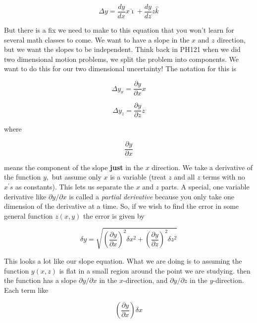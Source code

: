 \begin{equation*}
   \Delta y=\frac{dy}{dx}x\hat{\imath}+\frac{dy}{dz}z\hat{k}
\end{equation*}

But there is a fix we need to make to this equation that you won't learn for several math classes to come. We want to have a slope in the $x$ and $z$ direction, but we want the slopes to be independent. Think back in PH121 when we did two dimensional motion problems, we split the problem into components. We want to do this for our two dimensional uncertainty! The notation for this is

\begin{equation*}
	\Delta y_{x}=\frac{\partial y}{\partial x}x
\end{equation*}

\begin{equation*}
	\Delta y_{z}=\frac{\partial y}{\partial z}z
\end{equation*}

where 

\begin{equation*}
	\frac{\partial y}{\partial x}
\end{equation*}

means the component of the slope \textbf{just} in the $x$ direction. We take a derivative of the function $y,$ but assume only $x$ is a variable (treat $z$ and all $z$ terms with no $x^{\prime }s$ as constants). This lets us separate the $x$ and $z$ parts. A special, one variable derivative like $\partial y/\partial x$ is called a \emph{partial derivative} because you only take one dimension of the derivative at a time. So, if we wish to find the error in some general function $z\left( x,y\right) $ the error is given by
 
\begin{equation*}
	\delta y=\sqrt{\left( \frac{\partial y}{\partial x}\right) ^{2}\delta x^{2}+\left( \frac{\partial y}{\partial z}\right) ^{2}\delta z^{2}}
\end{equation*}

This looks a lot like our slope equation. What we are doing is to assuming the function $y\left( x,z\right) $ is flat in a small region around the point we are studying. then the function has a slope $\partial y/\partial x$ in the $x$-direction, and $\partial y/\partial z$ in the $y$-direction. Each term like 

\begin{equation*}
	\left( \frac{\partial y}{\partial x}\right) \delta x
\end{equation*}

